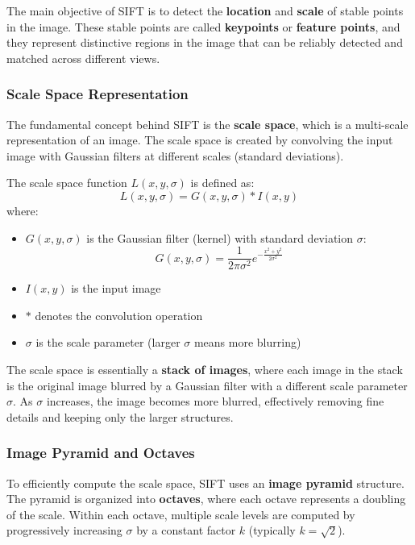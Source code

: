 \documentclass[11pt,a4paper]{article}
\theoremstyle{definition}
\theoremstyle{plain}
\theoremstyle{remark}
\begin{document}
The main objective of SIFT is to detect the \textbf{location} and \textbf{scale} of stable points in the image. These stable points are called \textbf{keypoints} or \textbf{feature points}, and they represent distinctive regions in the image that can be reliably detected and matched across different views.

\subsubsection{Scale Space Representation}

The fundamental concept behind SIFT is the \textbf{scale space}, which is a multi-scale representation of an image. The scale space is created by convolving the input image with Gaussian filters at different scales (standard deviations). 

The scale space function $L(x, y, \sigma)$ is defined as:
\begin{equation} \label{eq:scale_space}
    L(x, y, \sigma) = G(x, y, \sigma) * I(x, y)
\end{equation}
where:
\begin{itemize}
    \item $G(x, y, \sigma)$ is the Gaussian filter (kernel) with standard deviation $\sigma$:
    \begin{equation} \label{eq:gaussian_filter}
        G(x, y, \sigma) = \frac{1}{2\pi\sigma^2} e^{-\frac{x^2 + y^2}{2\sigma^2}}
    \end{equation}
    \item $I(x, y)$ is the input image
    \item $*$ denotes the convolution operation
    \item $\sigma$ is the scale parameter (larger $\sigma$ means more blurring)
\end{itemize}

The scale space is essentially a \textbf{stack of images}, where each image in the stack is the original image blurred by a Gaussian filter with a different scale parameter $\sigma$. As $\sigma$ increases, the image becomes more blurred, effectively removing fine details and keeping only the larger structures.

\subsubsection{Image Pyramid and Octaves}

To efficiently compute the scale space, SIFT uses an \textbf{image pyramid} structure. The pyramid is organized into \textbf{octaves}, where each octave represents a doubling of the scale. Within each octave, multiple scale levels are computed by progressively increasing $\sigma$ by a constant factor $k$ (typically $k = \sqrt{2}$).
\end{document}
